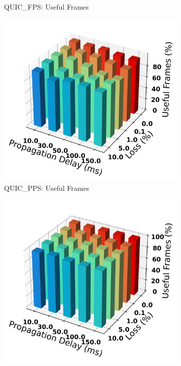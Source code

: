 \documentclass{mpaper}
\begin{document}
\begin{figure}
\begin{subfigure}[b]{0.25\textwidth}
      \caption{QUIC\_FPS: Useful Frames}
      \label{fig:FPS_bar-42}
  \end{subfigure}
  \hfill
  \begin{subfigure}[b]{0.25\textwidth}
      \centering
      \includegraphics[width=\textwidth]{Frame_Usefulness_Ratio/QUIC_PPS/AVG_Frame_Usefulness-42.png}
      \caption{QUIC\_PPS: Useful Frames}
      \label{fig:PPS_bar-42}
  \end{subfigure}
  \hfill
  \begin{subfigure}[b]{0.25\textwidth}
      \centering
      \includegraphics[width=\textwidth]{Frame_Usefulness_Ratio/UDP/AVG_Frame_Usefulness-42.png}

\end{subfigure}
\end{figure}
\end{document}
